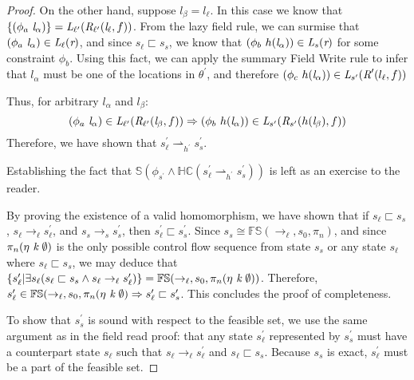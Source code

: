 \begin{proof}
On the other hand, suppose $l_\beta = l_\ell$. In this case we know that $\{(\phi_a\ \cfgnt{l}_\alpha)\} = \cfgnt{L}_{\ell^\prime}(\cfgnt{R}_{\ell^\prime}(\cfgnt{l}_\ell,f ))$. From the lazy field rule, we can surmise that $(\phi_a\ \emph{l}_\alpha) \in \emph{L}_{\ell}(\emph{r} )$, and since $s_\ell \sqsubset s_s$, we know that $(\phi_b\ h(\emph{l}_\alpha)) \in \emph{L}_{s}(\emph{r})$ for some constraint $\phi_b$. Using this fact, we can apply the summary Field Write rule to infer that $l_\alpha$ must be one of the locations in $\theta^\prime$, and therefore $(\phi_c\ h(\emph{l}_\alpha)) \in \emph{L}_{s^\prime}(\emph{R}^\prime(l_\ell,f))$

Thus, for arbitrary $l_\alpha$ and $l_\beta$:
$$(\phi_a\ \emph{l}_\alpha) \in \emph{L}_{\ell^\prime}(\emph{R}_{\ell^\prime}(\emph{l}_\beta,f )) \Rightarrow (\phi_b\ h(\emph{l}_\alpha))\in \emph{L}_{s^\prime}(\emph{R}_{s^\prime} (h(\emph{l}_\beta),f ))$$
Therefore, we have shown that $s_\ell^\prime \rightharpoonup_{h^\prime} s_s^\prime$.

Establishing the fact that $\mathbb{S}(\phi_{s^\prime} \wedge \mathbb{HC}(s_\ell^\prime \rightharpoonup_{h^\prime} s_s^\prime) )$ is left as an exercise to the reader.

By proving the existence of a valid homomorphism, we have shown that if $s_\ell \sqsubset s_s$, $s_\ell \rightarrow_\ell s_\ell^\prime$, and $s_s \rightarrow_s s_s^\prime$, then $s_\ell^\prime \sqsubset s_s^\prime$. Since $s_s \cong \mathbb{FS}(\rightarrow_\ell, s_0, \pi_n )$, and since $\pi_n (\eta\ \cfgnt{k}\ \emptyset)$  is the only possible control flow sequence from state $s_s$ or any state $s_\ell$ where $s_\ell \sqsubset s_s$, we may deduce that $\{ s_\ell^\prime | \exists s_\ell (s_\ell \sqsubset s_s \wedge s_\ell \rightarrow_\ell s_\ell^\prime ) \} = \mathbb{FS}(\rightarrow_\ell, s_0, \pi_n (\eta\ \cfgnt{k}\ \emptyset) )$. Therefore, $s_\ell^\prime \in \mathbb{FS}(\rightarrow_\ell, s_0, \pi_n (\eta\ \emph{k}\ \emptyset) \Rightarrow s_\ell^\prime \sqsubset s_s^\prime$. This concludes the proof of completeness.

To show that $s_s^\prime$ is sound with respect to the feasible set, we use the same argument as in the field read proof: that any state $s_\ell^\prime$ represented by $s_s^\prime$ must have a counterpart state $s_\ell$ such that $s_\ell \rightarrow_\ell s_\ell^\prime$ and $s_\ell \sqsubset s_s$. Because $s_s$ is exact, $s_\ell^\prime$ must be a part of the feasible set.

\end{proof}

